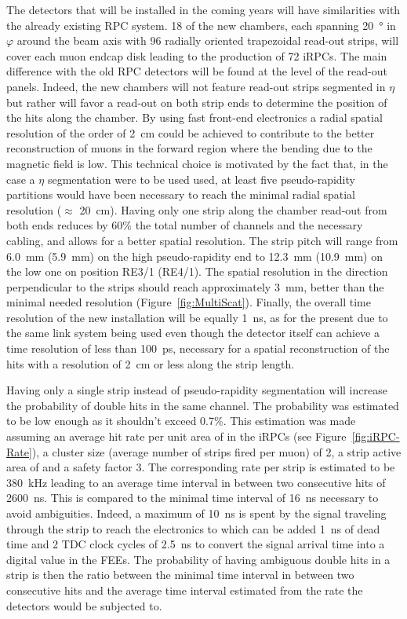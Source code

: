 	The detectors that will be installed in the coming years will have similarities with the already existing RPC system. 18 of the new chambers, each spanning \SI{20}{\degree} in $\varphi$ around the beam axis with 96 radially oriented trapezoidal read-out strips, will cover each muon endcap disk leading to the production of 72 iRPCs. The main difference with the old RPC detectors will be found at the level of the read-out panels. Indeed, the new chambers will not feature read-out strips segmented in $\eta$ but rather will favor a read-out on both strip ends to determine the position of the hits along the chamber. By using fast front-end electronics a radial spatial resolution of the order of \SI{2}{cm} could be achieved to contribute to the better reconstruction of muons in the forward region where the bending due to the magnetic field is low. This technical choice is motivated by the fact that, in the case a $\eta$ segmentation were to be used used, at least five pseudo-rapidity partitions would have been necessary to reach the minimal radial spatial resolution ($\approx$ \SI{20}{cm}). Having only one strip along the chamber read-out from both ends reduces by 60\% the total number of channels and the necessary cabling, and allows for a better spatial resolution. The strip pitch will range from \SI{6.0}{mm} (\SI{5.9}{mm}) on the high pseudo-rapidity end to \SI{12.3}{mm} (\SI{10.9}{mm}) on the low one on position RE3/1 (RE4/1). The spatial resolution in the direction perpendicular to the strips should reach approximately \SI{3}{mm}, better than the minimal needed resolution (Figure~\ref{fig:MultiScat}). Finally, the overall time resolution of the new installation will be equally \SI{1}{ns}, as for the present due to the same link system being used even though the detector itself can achieve a time resolution of less than \SI{100}{ps}, necessary for a spatial reconstruction of the hits with a resolution of \SI{2}{cm} or less along the strip length.
	
	Having only a single strip instead of pseudo-rapidity segmentation will increase the probability of double hits in the same channel. The probability was estimated to be low enough as it shouldn't exceed 0.7\%. This estimation was made assuming an average hit rate per unit area of  in the iRPCs (see Figure~\ref{fig:iRPC-Rate}), a cluster size (average number of strips fired per muon) of 2, a strip active area of  and a safety factor 3. The corresponding rate per strip is estimated to be \SI{380}{kHz} leading to an average time interval in between two consecutive hits of \SI{2600}{ns}. This is compared to the minimal time interval of \SI{16}{ns} necessary to avoid ambiguities. Indeed, a maximum of \SI{10}{ns} is spent by the signal traveling through the strip to reach the electronics to which can be added \SI{1}{ns} of dead time and 2 \acf{TDC} clock cycles of \SI{2.5}{ns} to convert the signal arrival time into a digital value in the FEEs. The probability of having ambiguous double hits in a strip is then the ratio between the minimal time interval in between two consecutive hits and the average time interval estimated from the rate the detectors would be subjected to.


